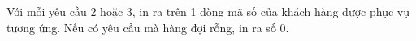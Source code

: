 Với mỗi yêu cầu 2 hoặc 3, in ra trên 1 dòng mã số của khách hàng được phục vụ tương ứng. Nếu có yêu cầu mà hàng đợi rỗng, in ra số 0.